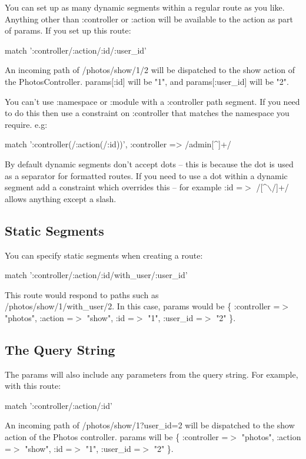 \documentclass[10pt]{book}
\newenvironment{code}{%
  \scriptsize
    \verbatim
}{%
    \endverbatim
    \newline
}
\begin{document}
You can set up as many dynamic segments within a regular route as you like. Anything other than :controller or :action will be available to the action as part of params. If you set up this route:
\begin{code}
match ':controller/:action/:id/:user_id'
\end{code}

An incoming path of /photos/show/1/2 will be dispatched to the show action of the PhotosController. params[:id] will be "1", and params[:user\_id] will be "2".

You can’t use :namespace or :module with a :controller path segment. If you need to do this then use a constraint on :controller that matches the namespace you require. e.g:
\begin{code}
match ':controller(/:action(/:id))', 
      :controller => /admin\/[^\/]+/
\end{code}

By default dynamic segments don’t accept dots –  this is because the dot is used as a separator for formatted routes. If  you need to use a dot within a dynamic segment add a constraint which  overrides this – for example :id =$>$ /[\textasciicircum$\backslash$/]+/ allows anything except a slash.

\subsection{ Static Segments}

You can specify static segments when creating a route:
\begin{code}
match ':controller/:action/:id/with_user/:user_id'
\end{code}

This route would respond to paths such as \\ /photos/show/1/with\_user/2. In this case, params would be \{ :controller =$>$ "photos", :action =$>$ "show", :id =$>$ "1", :user\_id =$>$ "2" \}.

\subsection{ The Query String}

The params will also include any parameters from the query string. For example, with this route:
\begin{code}
match ':controller/:action/:id'
\end{code}

An incoming path of /photos/show/1?user\_id=2 will be dispatched to the show action of the Photos controller. params will be \{ :controller =$>$ "photos", :action =$>$ "show", :id =$>$ "1", :user\_id =$>$ "2" \}.
\end{document}
